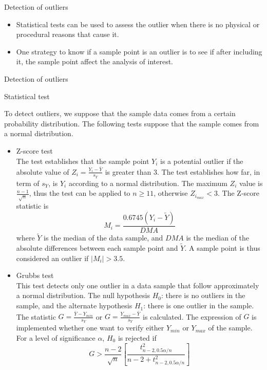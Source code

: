 \documentclass[8pt]{beamer}
\renewcommand{\emph}[1]{\textcolor{myorange}{#1}}
\begin{document}
\begin{frame}{Detection of outliers}
\begin{itemize}
            \item Statistical tests can be used to assess the outlier when there is no physical or procedural reasons that cause it. 
            \item One strategy to know if a sample point is an outlier is to see if after including it, the sample point affect the analysis of interest.
        \end{itemize}
   \end{frame}

\begin{frame}{Detection of outliers}
    \vspace{-5pt}
    \begin{block}{Statistical test}
    \end{block}
    \vspace{-5pt}
    To detect outliers, we suppose that the sample data comes from a certain \emph{probability distribution}. The following tests suppose that the sample comes from  a \emph{normal distribution}.

    \begin{itemize}
        \item \alert{Z-score test}\\
            The test establishes that the sample point $Y_i$ is a potential \emph{outlier} if the absolute value of $Z_i = \frac{Y_i - \bar{Y}}{s_Y}$ is greater than 3. The test establishes how far, in term of $s_Y$, is $Y_i$ according to a \emph{normal distribution}. The maximum $Z_i$ value is $\frac{n-1}{\sqrt{n}}$, thus the test can be applied to $n\geq 11$, otherwise $Z_{i_{max}} < 3$. The \emph{Z-score} statistic is
    \vspace{-7pt}
            \[
                M_i = \frac{0.6745 (Y_i - \tilde{Y})}{DMA}
            \]
            where $\tilde{Y}$ is the median of the data sample, and $DMA$ is the median of the absolute differences between each sample point and $\tilde{Y}$. A sample point is thus considered an \emph{outlier} if $|M_i| > 3.5$.
        \item \alert{Grubbs test}\\
            This test detects only one outlier in a data sample that follow approximately a \emph{normal distribution}. The \emph{null hypothesis $H_0$}: there is no outliers in the sample, and the \emph{alternate hypothesis $H_1$}: there is one outlier in the sample. The statistic $G = \frac{\bar{Y}-Y_{min}}{s_Y}$ or $G = \frac{Y_{max}-\bar{Y}}{s_Y}$ is calculated. The  expression of $G$ is implemented whether one want to verify either $Y_{min}$ or $Y_{max}$ of the sample. For a level of significance $\alpha$, $H_0$ is rejected if 
    \vspace{-9pt}
            \[
                G > \frac{n-2}{\sqrt{n}} \left[ \frac{t_{n-2, 0.5\alpha/n}^2 }{n-2 + t_{n-2, 0.5\alpha/n}^2}\right]
                \]


\end{itemize}
\end{frame}
\end{document}
